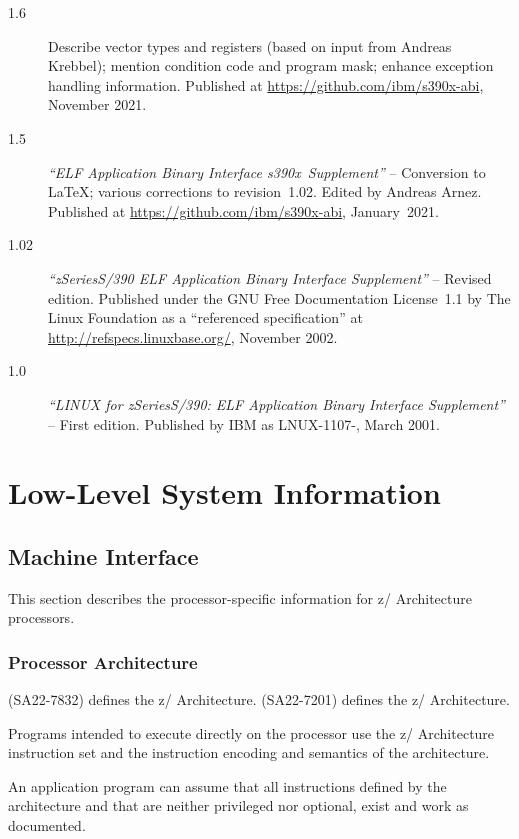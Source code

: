 \documentclass[english,11pt,twoside,toc=bib,toc=idx]{scrreprt}
\newcommand{\ABINAME}{s390x}
\newcommand{\ARCH}{z/\kern-1pt Ar\-chi\-tec\-ture}
\newcommand{\ARCHarch}{\ARCH}
\newcommand{\theARCH}{the \ARCH}
\newcommand{\ABINAME}{s390}
\newcommand{\ARCH}{ESA/390}
\newcommand{\ARCHarch}{the \ARCH{} ar\-chi\-tec\-ture}
\newcommand{\theARCH}{\ARCHarch}
\begin{document}
\begin{description}
\item[1.6] Describe vector types and registers (based on input from
  Andreas Krebbel); mention condition code and program mask; enhance
  exception handling information.  Published at
  \url{https://github.com/ibm/s390x-abi}, November 2021.
\item[1.5] \emph{``ELF Application Binary Interface
    \ABINAME{}~Supplement''} -- Conversion to \LaTeX{}; various
  corrections to revision~1.02.  Edited by Andreas Arnez.  Published at
  \url{https://github.com/ibm/s390x-abi}, January~2021.
\item[1.02] \emph{``{\ifzseries zSeries\else S/390\fi} ELF Application
    Binary Interface Supplement''} -- Revised edition.  Published under
  the GNU Free Documentation License~1.1 by The Linux Foundation as a
  ``referenced specification'' at \url{http://refspecs.linuxbase.org/},
  November 2002.
\item[1.0] \emph{``LINUX for {\ifzseries zSeries\else S/390\fi}: ELF
    Application Binary Interface Supplement''} -- First edition.
  Published by IBM as LNUX-1107-{\fi}, March 2001.
\end{description}

\chapter{Low-Level System Information}
\section{Machine Interface}
This section describes the processor-specific information for
\ARCH{} processors.

\subsection{Processor Architecture}
{\ifzseries
  \cite{sa22} (SA22-7832) defines \theARCH{}.
  \else
  \cite{sa22} (SA22-7201) defines \theARCH{}.
  \fi}


Programs intended to execute directly on the processor use the
\ARCH{} instruction set and the
instruction encoding and semantics of the architecture.

An application program can assume that all instructions defined by the
architecture and that are neither privileged nor optional, exist and work
as documented.
\end{document}
